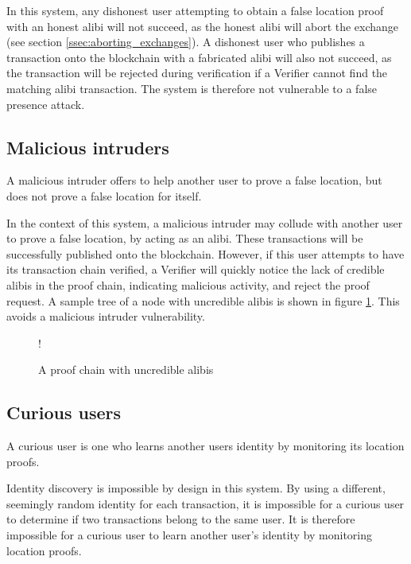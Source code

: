 In this system, any dishonest user attempting to obtain a false location proof with an honest alibi will not succeed, as the honest alibi will abort the exchange (see section \ref{ssec:aborting_exchanges}). A dishonest user who publishes a transaction onto the blockchain with a fabricated alibi will also not succeed, as the transaction will be rejected during verification if a Verifier cannot find the matching alibi transaction. The system is therefore not vulnerable to a false presence attack.

\subsection{Malicious intruders}
A malicious intruder offers to help another user to prove a false location, but does not prove a false location for itself.

In the context of this system, a malicious intruder may collude with another user to prove a false location, by acting as an alibi. These transactions will be successfully published onto the blockchain. However, if this user attempts to have its transaction chain verified, a Verifier will quickly notice the lack of credible alibis in the proof chain, indicating malicious activity, and reject the proof request. A sample tree of a node with uncredible alibis is shown in figure \ref{fig:uncredible_tree}. This avoids a malicious intruder vulnerability.

\begin{figure}[H]
\begin{center}
\resizebox {0.6\columnwidth} {!} {}
\vspace{-3.25cm}
\caption{A proof chain with uncredible alibis}
\label{fig:uncredible_tree}
\end{center}
\end{figure}

\subsection{Curious users}
A curious user is one who learns another users identity by monitoring its location proofs.

Identity discovery is impossible by design in this system. By using a different, seemingly random identity for each transaction, it is impossible for a curious user to determine if two transactions belong to the same user. It is therefore impossible for a curious user to learn another user's identity by monitoring location proofs.

